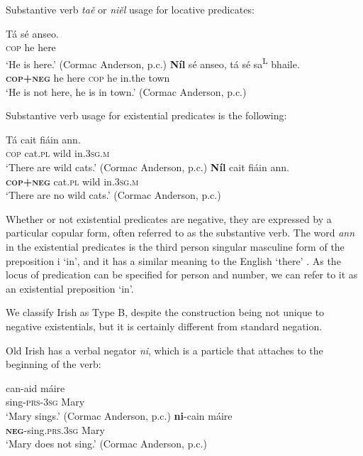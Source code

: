 \documentclass[output=paper,colorlinks,citecolor=brown]{langscibook}
\begin{document}
\begin{paperappendix}
\begin{unindented}
Substantive verb \textit{taě} or \textit{niěl} usage for locative predicates:
%
\begin{exe}\ex \gll Tá sé anseo. \\
\textsc{cop} he here \\
    \glt `He is here.' (Cormac Anderson, p.c.)
\ex \gll \textbf{Níl} sé anseo,  tá sé sa\textsuperscript{L} bhaile. \\
\textbf{\textsc{cop+neg}} he here \textsc{cop} he in.the  town \\
    \glt `He is not here, he is in town.' (Cormac Anderson, p.c.)
    \end{exe}

Substantive verb usage for existential predicates is the following:
%
\begin{exe}\ex \gll Tá cait    fiáin ann. \\
\textsc{cop} cat.\textsc{pl} wild in.\textsc{3sg.m} \\
    \glt `There are wild cats.' (Cormac Anderson, p.c.)
\ex \gll \textbf{Níl} cait   fiáin ann. \\
\textbf{\textsc{cop+neg}} cat.\textsc{pl} wild in.\textsc{3sg.m} \\
    \glt `There are no wild cats.' (Cormac Anderson, p.c.)
    \end{exe}

Whether or not existential predicates are negative, they are
expressed by a particular copular form, often referred to as the substantive verb. The word
\textit{ann} in the existential predicates is the third person singular
masculine form of the preposition i `in', and it has a similar meaning to
the English `there' \parencite[see][11]{Stenson2008}. As the locus of predication can be specified for person and number, we can refer to it as an existential preposition `in'.

We classify Irish as Type B, despite the construction being not unique to negative existentials, but it is certainly different from standard negation.


Old Irish has a verbal negator \textit{ni}, which is a particle that attaches to the beginning of the verb: 
%
\begin{exe}\ex \gll can-aid máire \\
sing-\textsc{prs-3sg} Mary \\
    \glt `Mary sings.' (Cormac Anderson, p.c.)
\ex \gll \textbf{ni}-cain máire \\
\textbf{\textsc{neg}}-sing.\textsc{prs.3sg} Mary \\
    \glt `Mary does not sing.' (Cormac Anderson, p.c.)
    \end{exe} 


\end{unindented}
\end{paperappendix}
\end{document}
